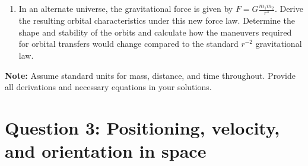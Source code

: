\documentclass[a4paper, 12pt]{exam}
\begin{document}
\begin{enumerate}[label = (\alph*)]
\begin{center}
	\end{center}
	
	\item  In an alternate universe, the gravitational force is given by $F = G \frac{m_1 m_2}{r^3}$. Derive the resulting orbital characteristics under this new force law. Determine the shape and stability of the orbits and calculate how the maneuvers required for orbital transfers would change compared to the standard $r^{-2}$ gravitational law.

\end{enumerate}

\textbf{Note:} Assume standard units for mass, distance, and time throughout. Provide all derivations and necessary equations in your solutions.
	
\pagebreak
	

\section*{Question 3: Positioning, velocity, and orientation in space}
\end{document}
